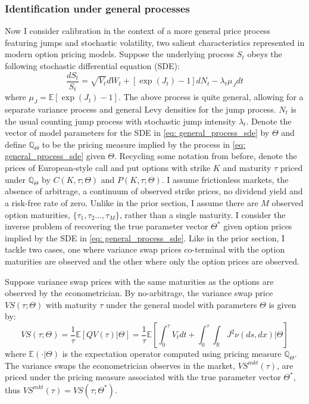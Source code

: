 \documentclass[12pt]{article}
\begin{document}
\subsubsection{Identification under general processes}\label{subsubsec: theory_general}
Now I consider calibration in the context of a more general price process featuring jumps and stochastic volatility, two salient characteristics represented in modern option pricing models. Suppose the underlying process $S_t$ obeys the following stochastic differential equation (SDE): 
\begin{equation}\label{eq: general_process_sde}
   \dfrac{dS_t}{S_t}=\sqrt{V_t} d W_t+[\exp(J_t) - 1] d N_t- \lambda_t \mu_J d t
\end{equation}
where $\mu_J = \mathbb{E}[\exp(J_t) - 1]$. The above process is quite general, allowing for a separate variance process and general Levy densities for the jump process. $N_t$ is the usual counting jump process with stochastic jump intensity $\lambda_t$. Denote the vector of model parameters for the SDE in \eqref{eq: general_process_sde} by $\Theta$ and define $\mathbb{Q}_\Theta$ to be the pricing measure implied by the process in \eqref{eq: general_process_sde} given $\Theta$. Recycling some notation from before, denote the prices of European-style call and put options with strike $K$ and maturity $\tau$ priced under $\mathbb{Q}_\Theta$ by $C(K,\tau; \Theta)$ and $P(K, \tau; \Theta)$. I assume frictionless markets, the absence of arbitrage, a continuum of observed strike prices, no dividend yield and a risk-free rate of zero. Unlike in the prior section, I assume there are $M$ observed option maturities, $\lbrace\tau_1, \tau_2 \ldots, \tau_M\rbrace$, rather than a single maturity. I consider the inverse problem of recovering the true parameter vector $\Theta^*$ given option prices implied by the SDE in \eqref{eq: general_process_sde}. Like in the prior section, I tackle two cases, one where variance swap prices co-terminal with the option maturities are observed and the other where only the option prices are observed.

Suppose variance swap prices with the same maturities as the options are observed by the econometrician. By no-arbitrage, the variance swap price $VS(\tau; \Theta)$ with maturity $\tau$ under the general model with parameters $\Theta$ is given by:
\begin{equation}\label{eq: general_var_swap}
 VS(\tau;\Theta) = \dfrac{1}{\tau}  \mathbb{E}\left[QV(\tau) \vert \Theta\right] = \dfrac{1}{\tau} \mathbb{E}\left[\int_0^{\tau} V_t  d t + \int_0^{\tau} \int_{\mathbb{R}} J^2 \nu(d s, d x) \Big\vert \Theta\right]
\end{equation}
where $\mathbb{E}(\cdot\vert \Theta)$ is the expectation operator computed using pricing measure $\mathbb{Q}_\Theta$. The variance swaps the econometrician observes in the market, $VS^{mkt}(\tau)$, are priced under the pricing measure associated with the true parameter vector $\Theta^*$, thus  $VS^{mkt}(\tau) =  VS(\tau; \Theta^*)$. 
\end{document}
